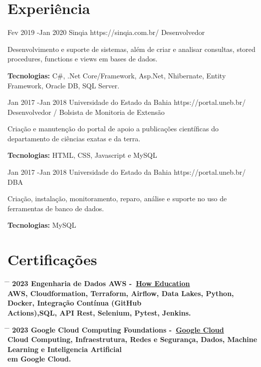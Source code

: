 \documentclass{article}
\begin{document}
\section*{Experiência}

\begin{job}
	{Fev 2019 -}{Jan 2020}
	{Sinqia}
	{https://sinqia.com.br/}
	{Desenvolvedor}%
	{Desenvolvimento e suporte de sistemas, além de criar e analisar consultas, stored procedures, functions e views em bases de dados.\\
		\rule{0mm}{5mm}\textbf{Tecnologias:} C\#, {.Net} Core/Framework, Asp.Net, Nhibernate, Entity Framework, Oracle DB, SQL Server.}
\end{job}

\begin{job}
	{Jan 2017 -}{Jan 2018}
	{Universidade do Estado da Bahia}
	{https://portal.uneb.br/}
	{Desenvolvedor / Bolsista de Monitoria de Extensão}%
	{Criação e manutenção do portal de apoio a publicações científicas do departamento de ciências exatas e da terra.\\
		\rule{0mm}{5mm}\textbf{Tecnologias:} HTML, CSS, Javascript e MySQL}
\end{job}

\begin{job}
	{Jan 2017 -}{Jan 2018}
	{Universidade do Estado da Bahia}
	{https://portal.uneb.br/}
	{DBA}%
	{Criação, instalação, monitoramento, reparo, análise e suporte no uso de ferramentas de banco de dados.\\
		\rule{0mm}{5mm}\textbf{Tecnologias:} MySQL}
\end{job}

\section*{Certificações}

\begin{tabbing}
	\hspace{2cm} \= \hspace{4cm} \= \kill
	\bf{2023} \> Engenharia de Dados AWS -~\href{https://howedu.com.br/}{How Education} \\
	AWS, Cloudformation, Terraform, Airflow, Data Lakes, Python, Docker, Integração Contínua (GitHub\\ Actions),SQL, API Rest, Selenium, Pytest, Jenkins. \\
\end{tabbing}

\begin{tabbing}
	\hspace{2cm} \= \hspace{4cm} \= \kill
	\bf{2023} \> Google Cloud Computing Foundations -~\href{https://www.cloudskillsboost.google/public_profiles/3a03b48f-00f0-42a3-9800-4c045d78b21e/badges/3540421}{Google Cloud} \\
	Cloud Computing, Infraestrutura, Redes e Segurança, Dados, Machine Learning e Inteligencia Artificial\\ em Google Cloud. \\
\end{tabbing}
\end{document}
